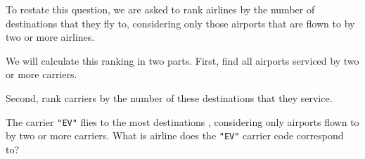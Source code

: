 \documentclass[]{book}
\newenvironment{Shaded}{\begin{snugshade}}{\end{snugshade}}
\newcommand{\CommentTok}[1]{\textcolor[rgb]{0.56,0.35,0.01}{\textit{#1}}}
\newcommand{\DataTypeTok}[1]{\textcolor[rgb]{0.13,0.29,0.53}{#1}}
\newcommand{\DecValTok}[1]{\textcolor[rgb]{0.00,0.00,0.81}{#1}}
\newcommand{\KeywordTok}[1]{\textcolor[rgb]{0.13,0.29,0.53}{\textbf{#1}}}
\newcommand{\NormalTok}[1]{#1}
\newcommand{\OperatorTok}[1]{\textcolor[rgb]{0.81,0.36,0.00}{\textbf{#1}}}
\newcommand{\StringTok}[1]{\textcolor[rgb]{0.31,0.60,0.02}{#1}}
\theoremstyle{plain}
\theoremstyle{remark}
\begin{document}
To restate this question, we are asked to rank airlines by the number of destinations that they fly to, considering only those airports that are flown to by two or more airlines.

We will calculate this ranking in two parts.
First, find all airports serviced by two or more carriers.

\begin{Shaded}
\end{Shaded}

Second, rank carriers by the number of these destinations that they service.

\begin{Shaded}
\end{Shaded}

The carrier \texttt{"EV"} flies to the most destinations , considering only airports flown to by two or more carriers.
What is airline does the \texttt{"EV"} carrier code correspond to?
\end{document}
